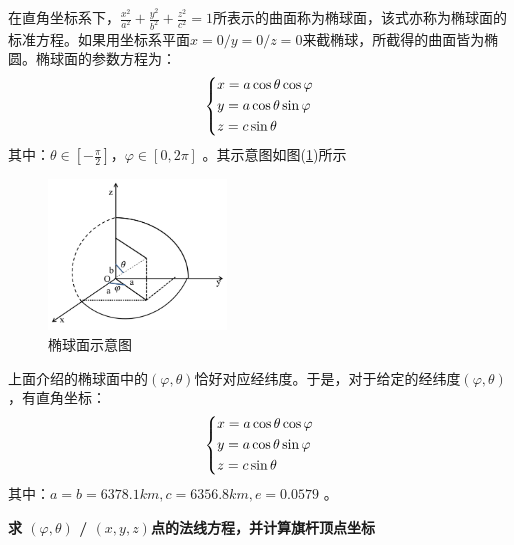             \begin{definition}
            \par
            在直角坐标系下，$\frac {x^2}{a^2}+\frac{y^2}{b^2}+\frac{z^2}{c^2}= 1$所表示的曲面称为椭球面，该式亦称为椭球面的标准方程。如果用坐标系平面$x=0/y=0/z=0$来截椭球，所截得的曲面皆为椭圆。椭球面的参数方程为：
            \begin{equation*}
            \left\{\begin{lgathered}
            x=a \cos\theta \cos\varphi\\
            y=a \cos \theta \sin\varphi\\
            z=c \sin\theta
            \end{lgathered} \right.
            \end{equation*}
            其中：$\theta \in[-\frac \pi2]$，$\varphi\in[0,2\pi]$ 。其示意图如图(\ref{fig:椭球面示意图})所示
            \begin{figure}[H]
            \centering
            \includegraphics[height=4cm]{images/5.jpg}
            \caption{椭球面示意图}
            \label{fig:椭球面示意图}
            \end{figure}
            \end{definition}
            \par
            上面介绍的椭球面中的$(\varphi,\theta)$恰好对应经纬度。于是，对于给定的经纬度$(\varphi,\theta)$ ，有直角坐标：
            \begin{equation*}
             \left\{\begin{lgathered}
             x=a \cos\theta\cos\varphi\\
             y=a \cos \theta \sin\varphi\\
             z=c \sin\theta
             \end{lgathered} \right.
            \end{equation*}
            其中：$a = b=6378.1km,c=6356.8km,e=0.0579$ 。
            \par
            \checkmark \textbf {求 $(\varphi,\theta)$ / $(x,y,z)$点的法线方程，并计算旗杆顶点坐标}
